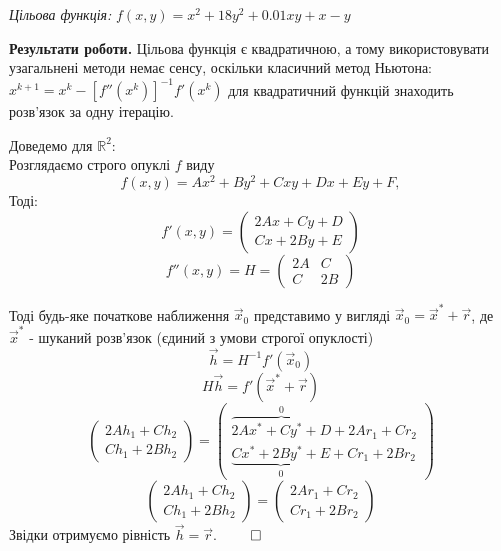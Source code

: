 \documentclass{extreport}
\begin{document}
\emph{Цільова функція:}
$f(x,y) = x^2 + 18y^2 + 0.01xy + x - y$

\noindent\textbf{Результати роботи.}
Цільова функція є квадратичною, а тому використовувати узагальнені методи немає сенсу,
оскільки класичний метод Ньютона: $x^{k+1} = x^k - [f''(x^k)]^{-1} f'(x^k)$
для квадратичний функцій знаходить розв'язок за одну ітерацію.

Доведемо для $\mathbb{R}^2$: \\
Розглядаємо строго опуклі $f$ виду
$$f(x,y) = Ax^2 + By^2 + Cxy + Dx + Ey + F, $$
Тоді: $$f'(x,y) = \begin{pmatrix}
    2Ax + Cy + D \\
    Cx + 2By + E
\end{pmatrix}$$
$$ f''(x,y) = H  = \begin{pmatrix}
    2A & C \\
    C & 2B
\end{pmatrix}$$

Тоді будь-яке початкове наближення $\vec x_0$ представимо у вигляді
$\vec x_0 = \vec x^* + \vec r$, де $\vec x^*$ - шуканий розв'язок (єдиний з умови строгої опуклості)
$$\vec h = H^{-1} f'(\vec x_0)$$
$$H \vec h = f'(\vec x^* + \vec r)$$
$$ \begin{pmatrix}
    2Ah_1 + Ch_2 \\
    Ch_1 + 2Bh_2
\end{pmatrix} =
\begin{pmatrix}
    \overbrace{2Ax^* + Cy^* + D}^{0} + 2Ar_1 + Cr_2\\
    \underbrace{Cx^* + 2By^* + E}_{0} + Cr_1 + 2Br_2
\end{pmatrix}$$
$$ \begin{pmatrix}
    2Ah_1 + Ch_2 \\
    Ch_1 + 2Bh_2
\end{pmatrix} =
\begin{pmatrix}
    2Ar_1 + Cr_2\\
    Cr_1 + 2Br_2
\end{pmatrix}$$
Звідки отримуємо рівність $\vec h = \vec r$. $\qed$ 
\end{document}
